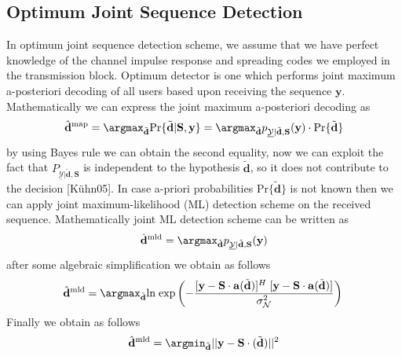 \subsection{Optimum Joint Sequence Detection}
In optimum joint sequence detection scheme, we assume that we have perfect knowledge of the channel impulse response and spreading codes we employed in the transmission block. Optimum detector is one which performs joint maximum a-posteriori decoding of all users based upon receiving the sequence $\mathrm{\mathbf{y}}$. Mathematically we can express the joint maximum a-posteriori decoding as
\begin{equation}
\mathrm{\hat{\mathbf{d}}^{map}}=\argmax_{\mathrm{\tilde{\mathbf{d}}}} \mathrm{Pr}\{\mathrm{\tilde{\mathbf{d}}}\vert \mathrm{\mathbf{S}},\mathrm{\mathbf{y}}\} = \argmax_{\mathrm{\tilde{\mathbf{d}}}} p_{\underline{\mathcal{Y}}\vert\mathrm{\tilde{\mathbf{d}}},\mathrm{\mathbf{S}}}(\mathrm{\mathbf{y}})\cdot \mathrm{Pr}\{\mathrm{\tilde{\mathbf{d}}}\}
\end{equation}
by using Bayes rule we can obtain the second equality, now we can exploit the fact that $P_{\underline{\mathcal{Y}}\vert \mathrm{\tilde{\mathbf{d}}},\mathrm{\mathbf{S}}}$ is independent to the hypothesis $\mathrm{\tilde{\mathbf{d}}}$, so it does not contribute to the decision [K\"uhn05]. In case a-priori probabilities $\mathrm{Pr\{\tilde{\mathbf{d}}\}}$ is not known then we can apply joint maximum-likelihood (ML) detection scheme on the received sequence. Mathematically joint ML detection scheme can be written as
\begin{equation}
\mathrm{\hat{\mathbf{d}}^{mld}}=\argmax_{\mathrm{\tilde{\mathbf{d}}}}p_{\underline{\mathcal{Y}}\vert\mathrm{\tilde{\mathbf{d}}},\mathrm{\mathbf{S}}}(\mathrm{\mathbf{y}})
\end{equation}
after some algebraic simplification we obtain as follows
\begin{equation}
\mathrm{\hat{\mathbf{d}}^{mld}}=\argmax_{\mathrm{\tilde{\mathbf{d}}}} \mathrm{ln\;exp}\left(-\frac{\hbox{$[\mathrm{\mathbf{y}}-\mathrm{\mathbf{S}}\cdot \mathrm{\mathbf{a}}(\mathrm{\tilde{\mathbf{d}}})]^{H}\;[\mathrm{\mathbf{y}}-\mathrm{\mathbf{S}}\cdot \mathrm{\mathbf{a}}(\mathrm{\tilde{\mathbf{d}}})]$}} {\hbox{$\sigma^2_{\mathcal{N}}$}}\right) \\ \\
\end{equation}
Finally we obtain as follows
\begin{equation}
\mathrm{\hat{\mathbf{d}}^{mld}}=\argmin_{\mathrm{\tilde{\mathbf{d}}}}\vert \vert \mathrm{\mathbf{y}}-\mathrm{\mathbf{S}}\cdot\mathrm{(\tilde{\mathbf{d}})}\vert\vert^2
\end{equation}
